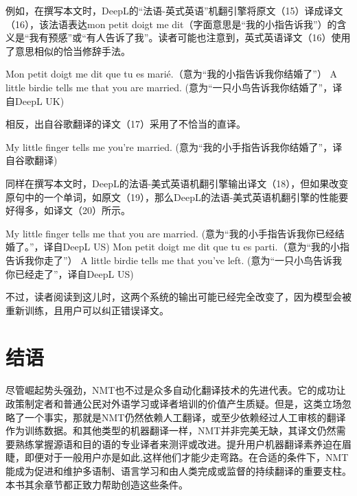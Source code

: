 \documentclass[output=paper]{langscibook}
\begin{document}
例如，在撰写本文时，DeepL的“法语-英式英语”机翻引擎将原文（15）译成译文（16），该法语表达mon petit doigt me dit（字面意思是“我的小指告诉我”）的含义是“我有预感”或“有人告诉了我”。读者可能也注意到，英式英语译文（16）使用了意思相似的恰当修辞手法。


\ea Mon petit doigt me dit que tu es marié.（意为“我的小指告诉我你结婚了”）
\ex A little birdie tells me that you are married. (意为“一只小鸟告诉我你结婚了”，译自DeepL UK)
\z

相反，出自谷歌翻译的译文（17）采用了不恰当的直译。

\ea
My little finger tells me you're married. (意为“我的小手指告诉我你结婚了”，译自谷歌翻译)
\z

同样在撰写本文时，DeepL的法语-美式英语机翻引擎输出译文（18），但如果改变原句中的一个单词，如原文（19），那么DeepL的法语-美式英语机翻引擎的性能要好得多，如译文（20）所示。

\ea
My little finger tells me that you are married. (意为“我的小手指告诉我你已经结婚了。”，译自DeepL US)
\ex
Mon petit doigt me dit que tu es parti.（意为“我的小指告诉我你走了”）
\ex
A little birdie tells me that you've left. (意为“一只小鸟告诉我你已经走了”，译自DeepL US)
\z

不过，读者阅读到这儿时，这两个系统的输出可能已经完全改变了，因为模型会被重新训练，且用户可以纠正错误译文。


\section{结语}
尽管崛起势头强劲，NMT也不过是众多自动化翻译技术的先进代表。它的成功让政策制定者和普通公民对外语学习或译者培训的价值产生质疑。但是，这类立场忽略了一个事实，那就是NMT仍然依赖人工翻译，或至少依赖经过人工审核的翻译作为训练数据。和其他类型的机器翻译一样，NMT并非完美无缺，其译文仍然需要熟练掌握源语和目的语的专业译者来测评或改进。提升用户机器翻译素养迫在眉睫，即便对于一般用户亦是如此,这样他们才能少走弯路。在合适的条件下，NMT能成为促进和维护多语制、语言学习和由人类完成或监督的持续翻译的重要支柱。本书其余章节都正致力帮助创造这些条件。



\sloppy
\printbibliography[heading=subbibliography,notkeyword=this]
\end{document}
